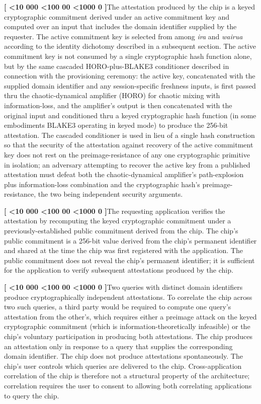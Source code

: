 \documentclass[12pt,letterpaper]{article}
\newcounter{para}
\newcommand{\padzero}{%
  \ifnum\value{para}<10 000\else%
  \ifnum\value{para}<100 00\else%
  \ifnum\value{para}<1000 0\else%
  \fi\fi\fi}
\newcommand{\para}{%
  \refstepcounter{para}\noindent\textbf{[\padzero\arabic{para}]}\hspace{0.5em}\ignorespaces}
\begin{document}
\para The attestation produced by the chip is a keyed cryptographic commitment derived under an active commitment key and computed over an input that includes the domain identifier supplied by the requester. The active commitment key is selected from among \emph{ira} and \emph{wairua} according to the identity dichotomy described in a subsequent section. The active commitment key is not consumed by a single cryptographic hash function alone, but by the same cascaded HORO-plus-BLAKE3 conditioner described in connection with the provisioning ceremony: the active key, concatenated with the supplied domain identifier and any session-specific freshness inputs, is first passed thru the chaotic-dynamical amplifier (HORO) for chaotic mixing with information-loss, and the amplifier's output is then concatenated with the original input and conditioned thru a keyed cryptographic hash function (in some embodiments BLAKE3 operating in keyed mode) to produce the 256-bit attestation. The cascaded conditioner is used in lieu of a single hash construction so that the security of the attestation against recovery of the active commitment key does not rest on the preimage-resistance of any one cryptographic primitive in isolation; an adversary attempting to recover the active key from a published attestation must defeat both the chaotic-dynamical amplifier's path-explosion plus information-loss combination and the cryptographic hash's preimage-resistance, the two being independent security arguments.

\para The requesting application verifies the attestation by recomputing the keyed cryptographic commitment under a previously-established public commitment derived from the chip. The chip's public commitment is a 256-bit value derived from the chip's permanent identifier and shared at the time the chip was first registered with the application. The public commitment does not reveal the chip's permanent identifier; it is sufficient for the application to verify subsequent attestations produced by the chip.

\para Two queries with distinct domain identifiers produce cryptographically independent attestations. To correlate the chip across two such queries, a third party would be required to compute one query's attestation from the other's, which requires either a preimage attack on the keyed cryptographic commitment (which is information-theoretically infeasible) or the chip's voluntary participation in producing both attestations. The chip produces an attestation only in response to a query that supplies the corresponding domain identifier. The chip does not produce attestations spontaneously. The chip's user controls which queries are delivered to the chip. Cross-application correlation of the chip is therefore not a structural property of the architecture; correlation requires the user to consent to allowing both correlating applications to query the chip.
\end{document}
